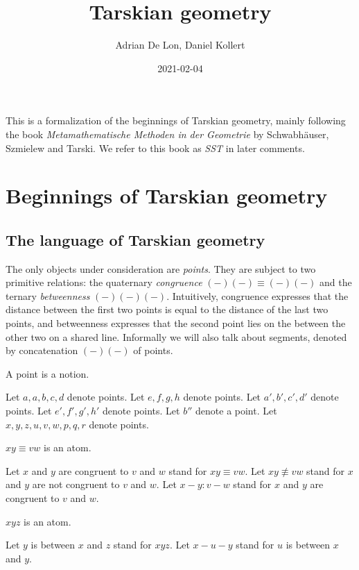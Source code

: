 \documentclass[10pt,a4paper,parskip=half,numbers=endperiod,headings=standardclasses,parskip]{scrbook}
\title{Tarskian geometry}
\author{Adrian De Lon, Daniel Kollert}
\date{2021-02-04}
\newcommand{\Cong}[4]{#1 #2 \equiv #3 #4}
\newcommand{\NotCong}[4]{#1 #2 \not\equiv #3 #4}
\newcommand{\Betw}[3]{#1 #2 #3}
\newcommand{\vara}{a}
\newcommand{\aprime}{a'}
\newcommand{\bprime}{b'}
\newcommand{\cprime}{c'}
\def\dprime{d'}
\newcommand{\eprime}{e'}
\newcommand{\fprime}{f'}
\newcommand{\gprime}{g'}
\newcommand{\hprime}{h'}
\newcommand{\bdoubleprime}{b''}
\begin{document}
  \maketitle

  This is a formalization of the beginnings of Tarskian geometry,
  mainly following the book
  \textit{Metamathematische Methoden in der Geometrie}
  by Schwabhäuser, Szmielew and Tarski.
  We refer to this book as \textit{SST} in later comments.


  \tableofcontents

  \chapter{Beginnings of Tarskian geometry}

  \section{The language of Tarskian geometry}

  The only objects under consideration are \textit{points}.
  They are subject to two primitive relations:
  the quaternary \textit{congruence} $\Cong{(-)}{(-)}{(-)}{(-)}$
  and the ternary \textit{betweenness} $\Betw{(-)}{(-)}{(-)}$.
  Intuitively, congruence expresses that the distance between the first two points is equal to the distance of the last two points, and betweenness expresses that
  the second point lies on the between the other two on a shared line.
  Informally we will also talk about segments, denoted by concatenation $(-)(-)$ of points.


  \begin{forthel}

    \begin{signature}
      A point is a notion.
    \end{signature}

    Let $\vara, a, b, c, d$ denote points.
    Let $e, f, g, h$ denote points.
    Let $\aprime, \bprime, \cprime, \dprime$ denote points.
    Let $\eprime, \fprime, \gprime, \hprime$ denote points.
    Let $\bdoubleprime$ denote a point.
    Let $x, y, z, u, v, w, p, q, r$ denote points.


    \begin{signature}
      $\Cong{x}{y}{v}{w}$ is an atom.
    \end{signature}
    Let $x$ and $y$ are congruent to $v$ and $w$ stand for $\Cong{x}{y}{v}{w}$.
    Let $\NotCong{x}{y}{v}{w}$ stand for $x$ and $y$ are not congruent to $v$ and $w$.
    Let $x-y : v-w$ stand for $x$ and $y$ are congruent to $v$ and $w$.

    \begin{signature}
      $\Betw{x}{y}{z}$ is an atom.
    \end{signature}

    Let $y$ is between $x$ and $z$ stand for $\Betw{x}{y}{z}$.
    Let $x-u-y$ stand for $u$ is between $x$ and $y$.
  \end{forthel}
\end{document}
